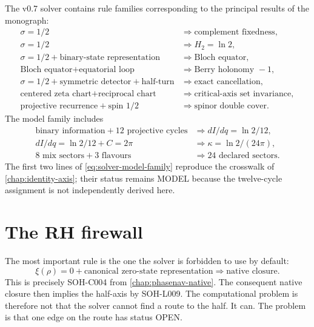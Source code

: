 The v0.7 solver contains rule families corresponding to the principal results
of the monograph:
\begin{align}
 \sigma=1/2
 &\Rightarrow \text{complement fixedness},\\
 \sigma=1/2
 &\Rightarrow H_2=\ln2,\\
 \sigma=1/2+\text{binary-state representation}
 &\Rightarrow \text{Bloch equator},\\
 \text{Bloch equator}+\text{equatorial loop}
 &\Rightarrow \text{Berry holonomy }-1,\\
 \sigma=1/2+\text{symmetric detector}+\text{half-turn}
 &\Rightarrow \text{exact cancellation},\\
 \text{centered zeta chart}+\text{reciprocal chart}
 &\Rightarrow \text{critical-axis set invariance},\\
 \text{projective recurrence}+\text{spin }1/2
 &\Rightarrow \text{spinor double cover}.
 \label{eq:solver-exact-family}
\end{align}
The model family includes
\begin{align}
 \text{binary information}+12\text{ projective cycles}
 &\Rightarrow dI/dq=\ln2/12,\\
 dI/dq=\ln2/12+C=2\pi
 &\Rightarrow \kappa=\ln2/(24\pi),\\
 8\text{ mix sectors}+3\text{ flavours}
 &\Rightarrow 24\text{ declared sectors}.
 \label{eq:solver-model-family}
\end{align}
The first two lines of \cref{eq:solver-model-family} reproduce the crosswalk of
\cref{chap:identity-axis}; their status remains MODEL because the twelve-cycle
assignment is not independently derived here.

\section{The RH firewall}

The most important rule is the one the solver is forbidden to use by default:
\begin{equation}
 \xi(\rho)=0
 +\text{canonical zero-state representation}
 \Longrightarrow
 \text{native closure}.
 \label{eq:solver-open-native}
\end{equation}
This is precisely SOH-C004 from \cref{chap:phasenav-native}.  The consequent
native closure then implies the half-axis by SOH-L009.  The computational
problem is therefore not that the solver cannot find a route to the half.  It
can.  The problem is that one edge on the route has status OPEN.

